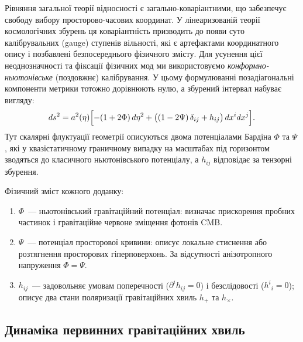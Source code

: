 \documentclass[12pt, a4paper]{article}
\begin{document}
Рівняння загальної теорії відносності є загально-коваріантними, що забезпечує
свободу вибору просторово-часових координат. У лінеаризованій теорії
космологічних збурень ця коваріантність призводить до появи суто
калібрувальних (gauge) ступенів вільності, які є артефактами координатного
опису і позбавлені безпосереднього фізичного змісту. Для усунення цієї
неоднозначності та фіксації фізичних мод ми використовуємо
\emph{конформно-ньютонівське} (поздовжнє) калібрування. У цьому формулюванні
позадіагональні компоненти метрики тотожно дорівнюють нулю, а збурений
інтервал набуває вигляду:
\begin{equation}\label{eq:perturbed_metric}
  ds^2 = a^2(\eta)\Bigl[
    -(1 + 2\Phi)\,d\eta^2
    + \bigl((1 - 2\Psi)\,\delta_{ij} + h_{ij}\bigr)\,dx^i dx^j
  \Bigr].
\end{equation}
Тут скалярні флуктуації геометрії описуються двома потенціалами
Бардіна $\Phi$ та $\Psi$ \cite{bardeen_1980}, які у квазістатичному
граничному випадку на масштабах під горизонтом зводяться до класичного
ньютонівського потенціалу, а $h_{ij}$ відповідає за тензорні збурення.

Фізичний зміст кожного доданку:
\begin{enumerate}
  \item $\Phi$~--- ньютонівський гравітаційний потенціал:
        визначає прискорення пробних частинок і гравітаційне
        червоне зміщення фотонів CMB.
  \item $\Psi$~--- потенціал просторової кривини: описує
        локальне стиснення або розтягнення просторових
        гіперповерхонь. За відсутності анізотропного напруження
        $\Phi = \Psi$.
  \item $h_{ij}$~--- задовольняє умовам поперечності
        ($\partial^i h_{ij} = 0$) і безслідовості
        ($h^i{}_i = 0$); описує два стани поляризації
        гравітаційних хвиль $h_+$ та $h_\times$.
\end{enumerate}

\subsection{Динаміка первинних гравітаційних хвиль}
\end{document}
